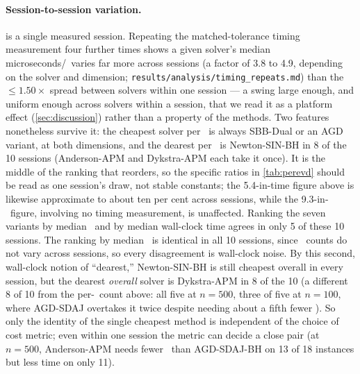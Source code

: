 \paragraph{Session-to-session variation.}
 is a single measured session. Repeating the
matched-tolerance timing measurement four further times shows a given
solver's median microseconds/\EVD\ varies far more across sessions (a
factor of 3.8 to 4.9, depending on the solver and dimension;
\texttt{results/analysis/timing\_repeats.md}) than the $\le\!1.50\times$
spread between solvers within one session --- a swing large enough, and
uniform enough across solvers within a session, that we read it as a
platform effect (\cref{sec:discussion}) rather than a property of the
methods. Two features nonetheless survive it: the cheapest solver per \EVD\
is always SBB-Dual or an AGD variant, at both dimensions, and the dearest per
\EVD\ is Newton-SIN-BH in 8 of the 10 sessions (Anderson-APM and Dykstra-APM
each take it once). It is the middle of the ranking that reorders, so the
specific ratios in \cref{tab:perevd} should be read as one session's draw,
not stable constants; the 5.4-in-time figure above is likewise approximate
to about ten per cent across sessions, while the
9.3-in-\EVDs\ figure, involving no timing measurement, is unaffected.
Ranking the seven variants by median \EVDs\ and by median wall-clock time
agrees in only 5 of these 10 sessions. The ranking by median \EVDs\ is
identical in all 10 sessions, since \EVD\ counts do not vary across sessions,
so every disagreement is wall-clock noise. By this second, wall-clock notion of
``dearest,'' Newton-SIN-BH is still cheapest overall in every session, but
the dearest \emph{overall} solver is Dykstra-APM in 8 of the 10 (a different
8 of 10 from the per-\EVD\ count above: all five at $n=500$, three of five
at $n=100$, where AGD-SDAJ overtakes it twice despite needing about a fifth
fewer \EVDs). So only the identity of the single cheapest method is
independent of the choice of cost metric; even within one session the
metric can decide a close pair (at $n=500$, Anderson-APM needs fewer \EVDs\
than AGD-SDAJ-BH on 13 of 18 instances but less time on only 11).

